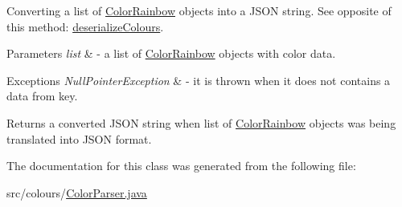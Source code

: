 Converting a list of \hyperlink{classcolours_1_1_color_rainbow}{Color\+Rainbow} objects into a J\+S\+ON string. See opposite of this method\+: \hyperlink{classcolours_1_1_color_parser_a1b1dd2f7269dd1fe21a88befb27c4f3f}{deserialize\+Colours}. 
\begin{DoxyParams}{Parameters}
{\em list} & -\/ a list of \hyperlink{classcolours_1_1_color_rainbow}{Color\+Rainbow} objects with color data. \\
\hline
\end{DoxyParams}

\begin{DoxyExceptions}{Exceptions}
{\em Null\+Pointer\+Exception} & -\/ it is thrown when it does not contains a data from key. \\
\hline
\end{DoxyExceptions}
\begin{DoxyReturn}{Returns}
a converted J\+S\+ON string when list of \hyperlink{classcolours_1_1_color_rainbow}{Color\+Rainbow} objects was being translated into J\+S\+ON format. 
\end{DoxyReturn}


The documentation for this class was generated from the following file\+:\begin{DoxyCompactItemize}
\item 
src/colours/\hyperlink{_color_parser_8java}{Color\+Parser.\+java}\end{DoxyCompactItemize}
